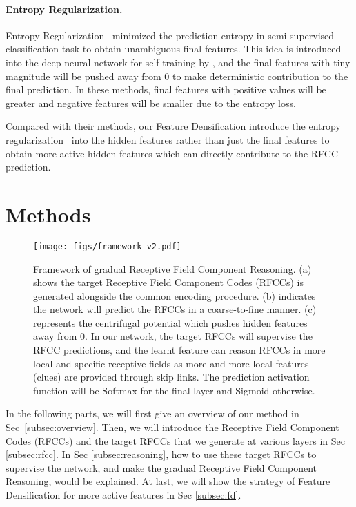 \documentclass[final]{cvpr}
\begin{document}
\paragraph{Entropy Regularization.}
Entropy Regularization~\cite{grandvalet2005semi} minimized the prediction entropy in semi-supervised classification task to obtain unambiguous final features. This idea is introduced into the deep neural network for self-training by \cite{lee2013pseudo}, and the final features with tiny magnitude will be pushed away from $0$ to make deterministic contribution to the final prediction. In these methods, final features with positive values will be greater and negative features will be smaller due to the entropy loss. 

Compared with their methods, our Feature Densification introduce the entropy regularization~\cite{grandvalet2005semi,lee2013pseudo} into the hidden features rather than just the final features to obtain more active hidden features which can directly contribute to the RFCC prediction.

\section{Methods}
\label{sec:methods}

\begin{figure*}[th]
    \centering
    \texttt{[image: figs/framework\_v2.pdf]}
    \caption{Framework of gradual Receptive Field Component Reasoning. (a) shows the target Receptive Field Component Codes (RFCCs) is generated alongside the common encoding procedure. (b) indicates the network will predict the RFCCs in a coarse-to-fine manner. (c) represents the centrifugal potential which pushes hidden features away from $0$. In our network, the target RFCCs will supervise the RFCC predictions, and the learnt feature can reason RFCCs in more local and specific receptive fields as more and more local features (clues) are provided through skip links. The prediction activation function will be Softmax for the final layer and Sigmoid otherwise.}
    \label{fig:framework}
\end{figure*}

In the following parts, we will first give an overview of our method in Sec~\ref{subsec:overview}. Then, we will introduce the Receptive Field Component Codes (RFCCs) and the target RFCCs that we generate at various layers in Sec \ref{subsec:rfcc}. In Sec \ref{subsec:reasoning}, how to use these target RFCCs to supervise the network, and make the gradual Receptive Field Component Reasoning, would be explained. At last, we will show the strategy of Feature Densification for more active features in Sec \ref{subsec:fd}.
\end{document}
